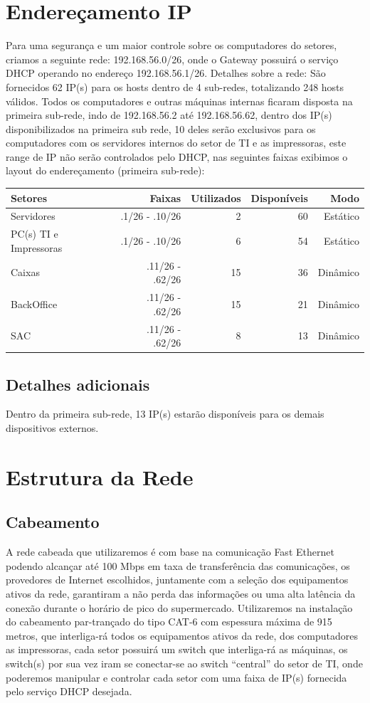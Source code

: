 \documentclass[12pt]{article}
\begin{document}
\section{Endereçamento IP}
Para uma segurança e um maior controle sobre os computadores do setores, criamos a seguinte rede: 192.168.56.0/26, onde o Gateway possuirá o serviço DHCP operando no endereço 192.168.56.1/26.
Detalhes sobre a rede: São fornecidos 62 IP(s) para os hosts dentro de 4 sub-redes, totalizando 248 hosts válidos. Todos os computadores e outras máquinas internas ficaram disposta na primeira sub-rede, indo de 192.168.56.2 até 192.168.56.62, dentro dos IP(s) disponibilizados na primeira sub rede, 10 deles serão exclusivos para os computadores com os servidores internos do setor de TI e as impressoras, este range de IP não serão controlados pelo DHCP, nas seguintes faixas exibimos o layout do endereçamento (primeira sub-rede):
\begin{center}
\begin{tabular}{| l | r | r | r | r |}
\hline 
Setores & Faixas & Utilizados & Disponíveis & Modo\\
\hline
Servidores & .1/26 - .10/26 & 2 & 60 & Estático\\
PC(s) TI e Impressoras & .1/26 - .10/26 & 6 & 54 & Estático\\
Caixas & .11/26 - .62/26 & 15 & 36 & Dinâmico\\
BackOffice & .11/26 - .62/26 & 15 & 21 & Dinâmico\\
SAC & .11/26 - .62/26 & 8 & 13 & Dinâmico\\
\hline
\end{tabular}
\end{center}
\subsection{Detalhes adicionais}
Dentro da primeira sub-rede, 13 IP(s) estarão disponíveis para os demais dispositivos externos.
\section{Estrutura da Rede}
\subsection{Cabeamento}
A rede cabeada que utilizaremos é com base na comunicação Fast Ethernet podendo alcançar até 100 Mbps em taxa de transferência das comunicações, os provedores de Internet escolhidos, juntamente com a seleção dos equipamentos ativos da rede, garantiram a não perda das informações ou uma alta latência da conexão durante o horário de pico do supermercado. Utilizaremos na instalação do cabeamento par-trançado do tipo CAT-6 com espessura máxima de 915 metros, que interliga-rá todos os equipamentos ativos da rede, dos computadores as impressoras, cada setor possuirá um switch que interliga-rá as máquinas, os switch(s) por sua vez iram se conectar-se ao switch “central” do setor de TI, onde poderemos manipular e controlar cada setor com uma faixa de IP(s) fornecida pelo serviço DHCP desejada.
\end{document}
